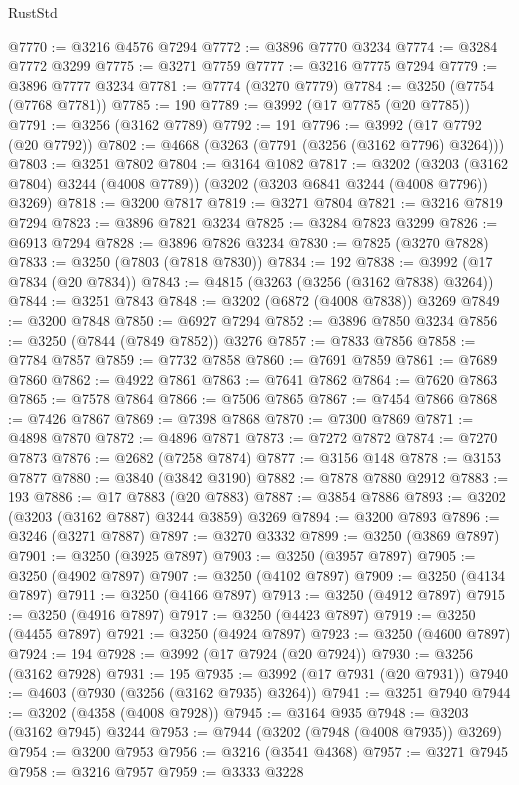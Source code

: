 \begin{lexlean}{RustStd}
\begin{coremodule}
@7770 := @3216 @4576 @7294
@7772 := @3896 @7770 @3234
@7774 := @3284 @7772 @3299
@7775 := @3271 @7759
@7777 := @3216 @7775 @7294
@7779 := @3896 @7777 @3234
@7781 := @7774 (@3270 @7779)
@7784 := @3250 (@7754 (@7768 @7781))
@7785 := 190
@7789 := @3992 (@17 @7785 (@20 @7785))
@7791 := @3256 (@3162 @7789)
@7792 := 191
@7796 := @3992 (@17 @7792 (@20 @7792))
@7802 := @4668 (@3263 (@7791 (@3256 (@3162 @7796) @3264)))
@7803 := @3251 @7802
@7804 := @3164 @1082
@7817 := @3202
    (@3203 (@3162 @7804) @3244 (@4008 @7789))
    (@3202 (@3203 @6841 @3244 (@4008 @7796)) @3269)
@7818 := @3200 @7817
@7819 := @3271 @7804
@7821 := @3216 @7819 @7294
@7823 := @3896 @7821 @3234
@7825 := @3284 @7823 @3299
@7826 := @6913 @7294
@7828 := @3896 @7826 @3234
@7830 := @7825 (@3270 @7828)
@7833 := @3250 (@7803 (@7818 @7830))
@7834 := 192
@7838 := @3992 (@17 @7834 (@20 @7834))
@7843 := @4815 (@3263 (@3256 (@3162 @7838) @3264))
@7844 := @3251 @7843
@7848 := @3202 (@6872 (@4008 @7838)) @3269
@7849 := @3200 @7848
@7850 := @6927 @7294
@7852 := @3896 @7850 @3234
@7856 := @3250 (@7844 (@7849 @7852)) @3276
@7857 := @7833 @7856
@7858 := @7784 @7857
@7859 := @7732 @7858
@7860 := @7691 @7859
@7861 := @7689 @7860
@7862 := @4922 @7861
@7863 := @7641 @7862
@7864 := @7620 @7863
@7865 := @7578 @7864
@7866 := @7506 @7865
@7867 := @7454 @7866
@7868 := @7426 @7867
@7869 := @7398 @7868
@7870 := @7300 @7869
@7871 := @4898 @7870
@7872 := @4896 @7871
@7873 := @7272 @7872
@7874 := @7270 @7873
@7876 := @2682 (@7258 @7874)
@7877 := @3156 @148
@7878 := @3153 @7877
@7880 := @3840 (@3842 @3190)
@7882 := @7878 @7880 @2912
@7883 := 193
@7886 := @17 @7883 (@20 @7883)
@7887 := @3854 @7886
@7893 := @3202 (@3203 (@3162 @7887) @3244 @3859) @3269
@7894 := @3200 @7893
@7896 := @3246 (@3271 @7887)
@7897 := @3270 @3332
@7899 := @3250 (@3869 @7897)
@7901 := @3250 (@3925 @7897)
@7903 := @3250 (@3957 @7897)
@7905 := @3250 (@4902 @7897)
@7907 := @3250 (@4102 @7897)
@7909 := @3250 (@4134 @7897)
@7911 := @3250 (@4166 @7897)
@7913 := @3250 (@4912 @7897)
@7915 := @3250 (@4916 @7897)
@7917 := @3250 (@4423 @7897)
@7919 := @3250 (@4455 @7897)
@7921 := @3250 (@4924 @7897)
@7923 := @3250 (@4600 @7897)
@7924 := 194
@7928 := @3992 (@17 @7924 (@20 @7924))
@7930 := @3256 (@3162 @7928)
@7931 := 195
@7935 := @3992 (@17 @7931 (@20 @7931))
@7940 := @4603 (@7930 (@3256 (@3162 @7935) @3264))
@7941 := @3251 @7940
@7944 := @3202 (@4358 (@4008 @7928))
@7945 := @3164 @935
@7948 := @3203 (@3162 @7945) @3244
@7953 := @7944 (@3202 (@7948 (@4008 @7935)) @3269)
@7954 := @3200 @7953
@7956 := @3216 (@3541 @4368)
@7957 := @3271 @7945
@7958 := @3216 @7957
@7959 := @3333 @3228

\end{coremodule}
\end{lexlean}

